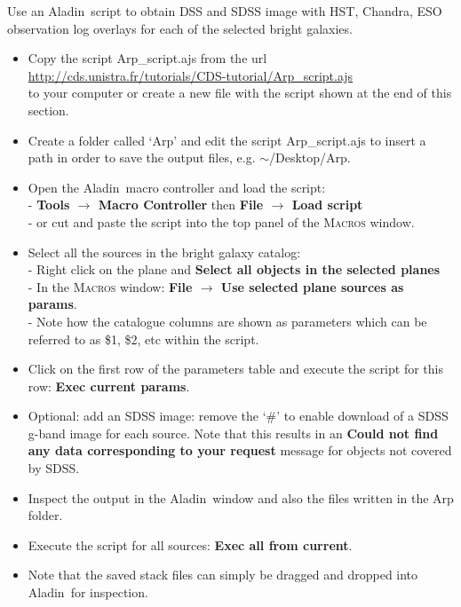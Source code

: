\documentclass [a4paper, 12pt]{article}
\newcommand{\aladin}{{\textsc{A}{ladin}}}
\begin{document}
Use an \aladin\ script to obtain DSS and SDSS image with HST, Chandra, ESO 
observation log overlays for each of the selected bright galaxies.
\renewcommand\UrlFont{\color{blue}\rmfamily}
\begin{itemize}
    \item Copy the script Arp\_script.ajs from the url \\
    \url{http://cds.unistra.fr/tutorials/CDS-tutorial/Arp_script.ajs} \\
     to your computer or create a new file with the script shown at the end
    of this section.
    \item Create a folder called `Arp' and edit the script Arp\_script.ajs to 
    insert a path in order to save the output files, e.g. $\sim$/Desktop/Arp.
    \item Open the \aladin\ macro controller and load the script:\\
    - \textbf{Tools $\rightarrow$ Macro Controller} then \textbf{File 
    $\rightarrow$ Load script}\\
    - or cut and paste the script into the top panel of the \textsc{Macros} 
    window.
    \item Select all the sources in the bright galaxy catalog:\\
    - Right click on the plane and \textbf{Select all objects in the selected 
    planes}\\
    - In the \textsc{Macros} window: \textbf{File $\rightarrow$ Use selected 
    plane sources as params}.\\
    - Note how the catalogue columns are shown as parameters which can be 
    referred to as \$1, \$2, etc within the script.
    \item Click on the first row of the parameters table and execute the 
script 
    for this row: \textbf{Exec current params}.
    \item Optional: add an SDSS image: remove the `\#' to enable download of a 
    SDSS g-band image for each source. Note that this results in an 
    \textbf{Could not find any data corresponding to your request} message for 
    objects not covered by SDSS.
    \item Inspect the output in the \aladin\ window and also the files written 
    in the Arp folder.
    \item Execute the script for all sources: \textbf{Exec all from current}.
    \item Note that the saved stack files can simply be dragged and dropped 
    into \aladin\ for inspection.
\end{itemize}
\end{document}

